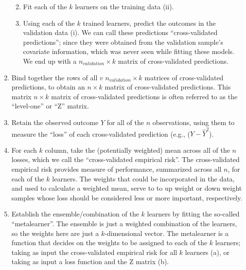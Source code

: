 \documentclass[12pt, krantz2,]{krantz}
\providecommand{\tightlist}{%
  \setlength{\itemsep}{0pt}\setlength{\parskip}{0pt}}
\theoremstyle{definition}
\theoremstyle{definition}
\theoremstyle{definition}
\newcommand{\1}{\mathbbm{1}}
\begin{document}
\begin{enumerate}
  \begin{enumerate}
  \def\labelenumii{\alph{enumii}.}
  \setcounter{enumii}{1}
  \tightlist
  \item
    Fit each of the \(k\) learners on the training data (ii).
  \item
    Using each of the \(k\) trained learners, predict the outcomes in the
    validation data (i). We can call these predictions
    ``cross-validated predictions''; since they were obtained from the
    validation sample's covariate information, which was never seen while
    fitting these models. We end up with a \(n_{validation} \times k\)
    matrix of cross-validated predictions.
  \end{enumerate}
\item
  Bind together the rows of all \(v\) \(n_{validation} \times k\) matrices of
  cross-validated predictions, to obtain an \(n \times k\) matrix of
  cross-validated predictions. This matrix \(n \times k\) matrix of
  cross-validated predictions is often referred to as the
  ``level-one'' or ``Z'' matrix.
\item
  Retain the observed outcome \(Y\) for all of the \(n\) observations, using
  them to measure the ``loss'' of each cross-validated prediction
  (e.g., (\(Y - \hat{Y}^2\)).
\item
  For each \(k\) column, take the (potentially weighted) mean across all of the
  \(n\) losses, which we call the ``cross-validated empirical risk''. The
  cross-validated empirical risk provides measure of performance, summarized
  across all \(n\), for each of the \(k\) learners. The weights that could be
  incorporated in the data, and used to calculate a weighted mean, serve to
  to up weight or down weight samples whose loss should be considered less or
  more important, respectively.
\item
  Establish the ensemble/combination of the \(k\) learners by fitting the
  so-called ``metalearner''. The ensemble is just a weighted combination of
  the learners, so the weights here are just a \(k\)-dimensional vector. The
  metalearner is a function that decides on the weights to be assigned to
  each of the \(k\) learners; taking as input the cross-validated empirical risk
  for all \(k\) learners (a), or taking as input a loss function and the Z
  matrix (b).


\end{enumerate}
\end{document}
